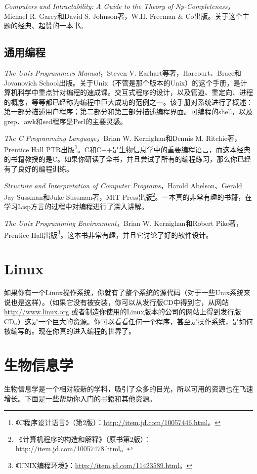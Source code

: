 \textit{Computers and Intractability: A Guide to the Theory of Np-Completeness}，Michael R. Garey和David S. Johnson著，W.H. Freeman \& Co出版。关于这个主题的经典、超赞的一本书。

\subsection{通用编程}
\textit{The Unix Programmers Manual}，Steven V.  Earhart等著，Harcourt、Brace和Jovanovich School出版。关于Unix（不管是那个版本的Unix）的这个手册，是计算机科学中重点针对编程的速成课。交互式程序的设计，以及管道、重定向、进程的概念，等等都已经称为编程中巨大成功的范例之一。该手册对系统进行了概述：第一部分描述用户程序；第二部分和第三部分描述编程界面。可编程的shell，以及grep、awk和sed程序是Perl的主要灵感。

\textit{The C Programming Language}，Brian W. Kernighan和Dennis M.  Ritchie著，Prentice Hall PTR出版\footnote{《C程序设计语言》（第2版）：\href{http://item.jd.com/10057446.html}{http://item.jd.com/10057446.html}。}。C和C++是生物信息学中的重要编程语言，而这本经典的书籍教授的是C。如果你研读了全书，并且尝试了所有的编程练习，那么你已经有了良好的编程训练。

\textit{Structure and Interpretation of Computer Programs}，Harold Abelson、Gerald Jay Sussman和Juke Sussman著，MIT Press出版\footnote{《计算机程序的构造和解释》（原书第2版）：\href{http://item.jd.com/10057478.html}{http://item.jd.com/10057478.html}。}。一本真的非常有趣的书籍，在学习Lisp方言的过程中对编程进行了深入讲解。

\textit{The Unix Programming Environment}，Brian W. Kernighan和Robert Pike著，Prentice Hall出版\footnote{《UNIX编程环境》：\href{http://item.jd.com/11423589.html}{http://item.jd.com/11423589.html}。}。这本书非常有趣，并且它讨论了好的软件设计。

\section{Linux}
如果你有一个Linux操作系统，你就有了整个系统的源代码（对于一些Unix系统来说也是这样）。（如果它没有被安装，你可以从发行版CD中得到它，从网站 \href{http://www.linux.org}{http://www.linux.org} 或者制造你使用的Linux版本的公司的网站上得到发行版CD。）这是一个巨大的资源。你可以看看任何一个程序，甚至是操作系统，是如何被编写的。现在你真的进入编程的世界了。

\section{生物信息学}
生物信息学是一个相对较新的学科，吸引了众多的目光，所以可用的资源也在飞速增长。下面是一些帮助你入门的书籍和其他资源。

